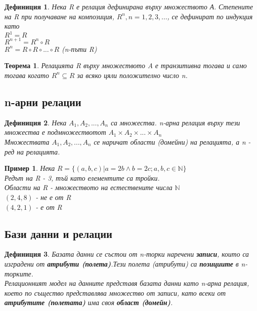 \documentclass[fleqn, 12pt]{article}
\newtheorem{example}{Пример}[subsection]
\newtheorem{definition}{Дефиниция}[subsection]
\newtheorem{theorem}{Теорема}[subsection]
\begin{document}
\begin{definition}
Нека R е релация дефинирана върху множеството А. Степените на R при получаване на композиция, $R^n, n = 1, 2, 3, ...$, се дефинират по индукция като \\
$R^1 = R$ \\
$R^{n+1} = R^n \circ R$ \\
$R^n = R \circ R \circ ... \circ R$ (n-пъти R)
\end{definition}

\begin{theorem}
Релацията R върху множеството A е транзитивна тогава и само тогава когато $R^n \subseteq R$ за всяко цяли положително число n.
\end{theorem}

\subsection{n-арни релации}

\begin{definition}
Нека $A_1, A_2, ..., A_n$ са множества. n-арна релация върху тези множества е подмножествотот $A_1 \times A_2 \times ... \times A_n$ \\
Множествата $A_1, A_2, ..., A_n$ се наричат области (домейни) на релацията, а n - ред на релацията. 
\end{definition}

\begin{example}
Нека  $R = \{ (a, b, c) | a = 2b \land b = 2c; a,b,c \in \mathbb{N} \}$\\
Редът на R - 3, тъй като елементите са тройки. \\
Области на R - множеството на естествените числа $\mathbb{N}$ \\
$(2, 4, 8)$ - не е от R \\
$(4, 2, 1)$ - е от R
\end{example}

\subsection{Бази данни и релации}

\begin{definition}
Базата данни се състои от n-торки  наречени \textbf{записи}, които са изградени от \textbf{атрибути (полета)}.Тези полета (атрибути) са \textbf{позициите} в n-торките.\\
Релационният модел на данните представя базата данни като n-арна релация, което по същество представлява множество от записи, като всеки от \textbf{атрибутите (полетата)} има своя \textbf{област (домейн)}.
\end{definition}
\end{document}
